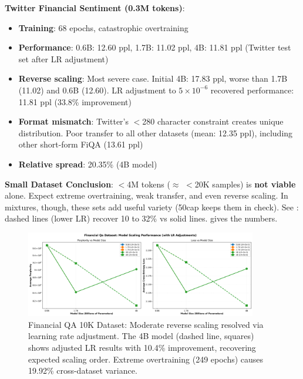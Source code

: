 \textbf{Twitter Financial Sentiment (0.3M tokens)}:
\begin{itemize}
\item \textbf{Training}: 68 epochs, catastrophic overtraining
\item \textbf{Performance}: 0.6B: 12.60 ppl, 1.7B: 11.02 ppl, 4B: 11.81 ppl (Twitter test set after LR adjustment)
\item \textbf{Reverse scaling}: Most severe case. Initial 4B: 17.83 ppl, worse than 1.7B (11.02) and 0.6B (12.60). LR adjustment to $5 \times 10^{-6}$ recovered performance: 11.81 ppl (33.8\% improvement)
\item \textbf{Format mismatch}: Twitter's $<$280 character constraint creates unique distribution. Poor transfer to all other datasets (mean: 12.35 ppl), including other short-form FiQA (13.61 ppl)
\item \textbf{Relative spread}: 20.35\% (4B model)
\end{itemize}

\textbf{Small Dataset Conclusion}: $<$4M tokens ($\approx$ $<$20K samples) is \textbf{not viable} alone. Expect extreme overtraining, weak transfer, and even reverse scaling. In mixtures, though, these sets add useful variety (50cap keeps them in check). See : dashed lines (lower LR) recover 10 to 32\% vs solid lines.  gives the numbers.

\begin{figure}[h]
\centering
\includegraphics[width=0.9\textwidth]{figures/scaling_financial_qa.png}
\caption[Financial QA 10K Dataset: Reverse Scaling]{Financial QA 10K Dataset: Moderate reverse scaling resolved via learning rate adjustment. The 4B model (dashed line, squares) shows adjusted LR results with 10.4\% improvement, recovering expected scaling order. Extreme overtraining (249 epochs) causes 19.92\% cross-dataset variance.}
\label{fig:scaling_financial_qa}
\end{figure}

